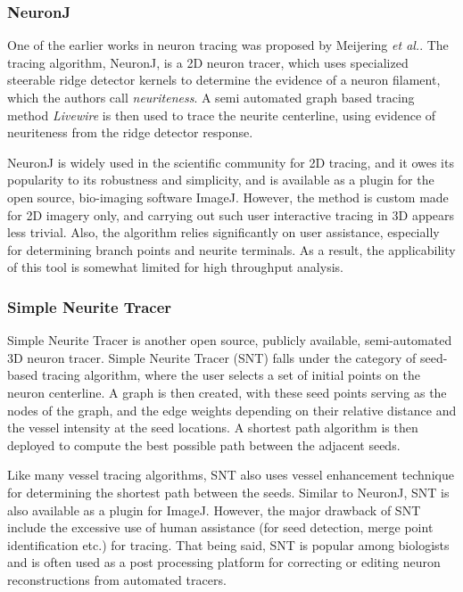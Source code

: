 \subsubsection{NeuronJ}
One of the earlier works in neuron tracing was proposed by Meijering \textit{et al.}\cite{meijering2004design}. The tracing algorithm, NeuronJ, is a 2D neuron tracer, which uses specialized steerable ridge detector kernels \cite{jacob2004steerable} to determine the evidence of a neuron filament, which the authors call \textit{neuriteness}. A semi automated graph based tracing method \textit{Livewire} \cite{livewire} is then used to trace the neurite centerline, using evidence of neuriteness from the ridge detector response. 

NeuronJ is widely used in the scientific community for 2D tracing, and it owes its popularity to its robustness and simplicity, and is available as a plugin for the open source, bio-imaging software ImageJ\cite{imageJ}. However, the method is custom made for 2D imagery only, and carrying out such user interactive tracing in 3D appears less trivial. Also, the algorithm relies significantly on user assistance, especially for determining branch points and neurite terminals. As a result, the applicability of this tool is somewhat limited for high throughput analysis.
 
\subsubsection{Simple Neurite Tracer}
Simple Neurite Tracer\cite{SNT} is another open source, publicly available, semi-automated 3D neuron tracer.
Simple Neurite Tracer (SNT) falls under the category of seed-based tracing algorithm, where the user selects a set of initial points on the neuron centerline. A graph is then created, with these seed points serving as the nodes of the graph, and the edge weights depending on their relative distance and the vessel intensity at the seed locations. A shortest path algorithm\cite{dijkstra1959note} is then deployed to compute the best possible path between the adjacent seeds. 

Like many vessel tracing algorithms, SNT also uses vessel enhancement technique \cite{frangi_vesselness,sato1998three} for determining the shortest path between the seeds. Similar to NeuronJ, SNT is also available as a plugin for ImageJ. However, the major drawback of SNT include the excessive use of human assistance (for seed detection, merge point identification etc.) for tracing. That being said, SNT is popular among biologists and is often used as a post processing platform for correcting or editing neuron reconstructions from automated tracers.

